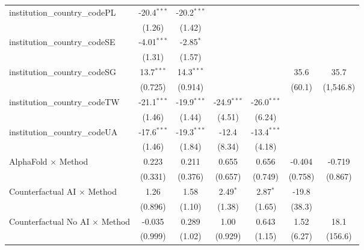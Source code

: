 \begin{tabular}{lcccccc}
   institution\_country\_codePL          & -20.4$^{***}$ & -20.2$^{***}$ &               &               &              &   \\   
                                         & (1.26)        & (1.42)        &               &               &              &   \\   
   institution\_country\_codeSE          & -4.01$^{***}$ & -2.85$^{*}$   &               &               &              &   \\   
                                         & (1.31)        & (1.57)        &               &               &              &   \\   
   institution\_country\_codeSG          & 13.7$^{***}$  & 14.3$^{***}$  &               &               & 35.6         & 35.7\\   
                                         & (0.725)       & (0.914)       &               &               & (60.1)       & (1,546.8)\\   
   institution\_country\_codeTW          & -21.1$^{***}$ & -19.9$^{***}$ & -24.9$^{***}$ & -26.0$^{***}$ &              &   \\   
                                         & (1.46)        & (1.44)        & (4.51)        & (6.24)        &              &   \\   
   institution\_country\_codeUA          & -17.6$^{***}$ & -19.3$^{***}$ & -12.4         & -13.4$^{***}$ &              &   \\   
                                         & (1.46)        & (1.84)        & (8.34)        & (4.18)        &              &   \\   
   AlphaFold $\times$ Method             & 0.223         & 0.211         & 0.655         & 0.656         & -0.404       & -0.719\\   
                                         & (0.331)       & (0.376)       & (0.657)       & (0.749)       & (0.758)      & (0.867)\\   
   Counterfactual AI $\times$ Method     & 1.26          & 1.58          & 2.49$^{*}$    & 2.87$^{*}$    & -19.8        &   \\   
                                         & (0.896)       & (1.10)        & (1.38)        & (1.65)        & (38.3)       &   \\   
   Counterfactual No AI $\times$ Method  & -0.035        & 0.289         & 1.00          & 0.643         & 1.52         & 18.1\\   
                                         & (0.999)       & (1.02)        & (0.929)       & (1.15)        & (6.27)       & (156.6)\\   

\end{tabular}
